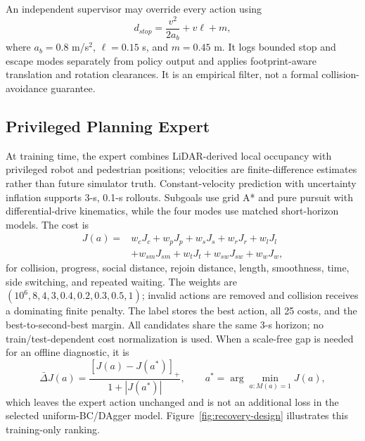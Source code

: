 An independent supervisor may override every action using
\begin{equation}
 d_{stop}=\frac{v^2}{2a_b}+v\ell+m,
\end{equation}
where $a_b=0.8$ m/s$^2$, $\ell=0.15$ s, and $m=0.45$ m.  It logs bounded stop
and escape modes separately from policy output and applies footprint-aware
translation and rotation clearances.  It is an empirical filter, not a formal
collision-avoidance guarantee.

\subsection{Privileged Planning Expert}
At training time, the expert combines LiDAR-derived local occupancy with
privileged robot and pedestrian positions; velocities are finite-difference
estimates rather than future simulator truth.  Constant-velocity prediction
with uncertainty inflation supports 3-s, 0.1-s rollouts.  Subgoals use grid A*
and pure pursuit with differential-drive kinematics, while the four modes use
matched short-horizon models.  The cost is
\begin{align}
J(a)={}&w_cJ_c+w_pJ_p+w_sJ_s+w_rJ_r+w_lJ_l \\
      &+w_{sm}J_{sm}+w_tJ_t+w_{sw}J_{sw}+w_wJ_w,
\end{align}
for collision, progress, social distance, rejoin distance, length, smoothness,
time, side switching, and repeated waiting.  The weights are
$(10^6,8,4,3,0.4,0.2,0.3,0.5,1)$; invalid actions are removed and collision
receives a dominating finite penalty.  The label stores the best action, all 25
costs, and the best-to-second-best margin.  All candidates share the same 3-s
horizon; no train/test-dependent cost normalization is used.  When a
scale-free gap is needed for an offline diagnostic, it is
\begin{equation}
 \bar\Delta J(a)=\frac{[J(a)-J(a^*)]_+}{1+|J(a^*)|},\qquad
 a^*=\arg\min_{a:M(a)=1}J(a),
\end{equation}
which leaves the expert action unchanged and is not an additional loss in the
selected uniform-BC/DAgger model.  Figure~\ref{fig:recovery-design} illustrates
this training-only ranking.

